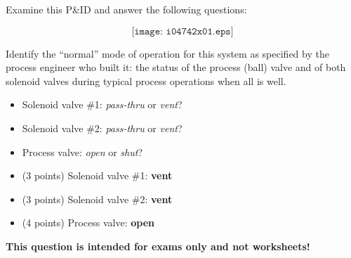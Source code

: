 

Examine this P\&ID and answer the following questions:

$$\texttt{[image: i04742x01.eps]}$$

\vskip 10pt

Identify the ``normal'' mode of operation for this system as specified by the process engineer who built it: the status of the process (ball) valve and of both solenoid valves during typical process operations when all is well.

\begin{itemize}
\item{} Solenoid valve \#1: {\it pass-thru} or {\it vent}?
\vskip 10pt
\item{} Solenoid valve \#2: {\it pass-thru} or {\it vent}?
\vskip 10pt
\item{} Process valve: {\it open} or {\it shut}?
\end{itemize}







\begin{itemize}
\item{} (3 points) Solenoid valve \#1: {\bf vent}
\vskip 10pt
\item{} (3 points) Solenoid valve \#2: {\bf vent}
\vskip 10pt
\item{} (4 points) Process valve: {\bf open}
\end{itemize}








{\bf This question is intended for exams only and not worksheets!}



